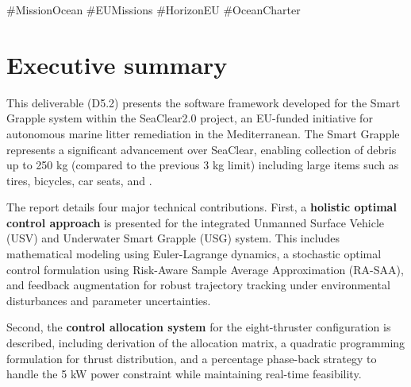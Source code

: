 \documentclass[a4paper,11pt]{article}
\let\oldsection\section
\renewcommand\section{\clearpage\oldsection}
\begin{document}
\printglossary[type=\acronymtype,title={Abbreviations}]
\vfill
\#MissionOcean \#EUMissions \#HorizonEU \#OceanCharter
\section*{Executive summary}

This deliverable (D5.2) presents the software framework developed for the Smart Grapple system within the SeaClear2.0 project, an EU-funded initiative for autonomous marine litter remediation in the Mediterranean. The Smart Grapple represents a significant advancement over SeaClear, enabling collection of debris up to 250 kg (compared to the previous 3 kg limit) including large items such as tires, bicycles, car seats, and . 

The report details four major technical contributions. First, a \textbf{holistic optimal control approach} is presented for the integrated Unmanned Surface Vehicle (USV) and Underwater Smart Grapple (USG) system. This includes mathematical modeling using Euler-Lagrange dynamics, a stochastic optimal control formulation using Risk-Aware Sample Average Approximation (RA-SAA), and feedback augmentation for robust trajectory tracking under environmental disturbances and parameter uncertainties.

Second, the \textbf{control allocation system} for the eight-thruster configuration is described, including derivation of the allocation matrix, a quadratic programming formulation for thrust distribution, and a percentage phase-back strategy to handle the 5 kW power constraint while maintaining real-time feasibility.
\end{document}
